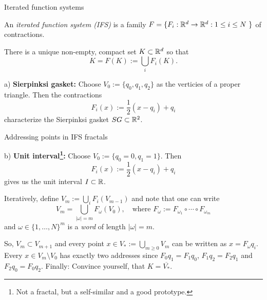 \begin{frame}{Iterated function systems}
    \begin{definition}
        An \textit{iterated function system (IFS)} is a family \(F = \{ F_i: \R^d \to \R^d : 1 \leq i \leq N \ \} \) of contractions.
    \end{definition}

    \begin{theorem}[Hutchinson]
        There is a unique non-empty, compact set \(K \subset \mathbb{R}^d \) so that
        \[ K = F(K) := \bigcup_i F_i(K). \]
    \end{theorem}

    \begin{example}
        a) \textbf{Sierpinksi gasket:} Choose \(V_0 := \{q_0, q_1, q_2 \} \) as the verticies of a proper triangle. Then the contractions
        \[ F_i(x) := \frac{1}{2}(x - q_i) + q_i \]
        characterize the Sierpinksi gasket \(SG \subset \mathbb{R}^2 \).
    \end{example}
\end{frame}

\begin{frame}{Addressing points in IFS fractals}
    \addtocounter{definition}{-1}
    \begin{example}[Cont.]
        b) \textbf{Unit interval\footnote{Not a fractal, but a self-similar and a good prototype.}:} Choose \(V_0 := \{q_0 = 0, q_1 = 1 \} \). Then
        \[ F_i(x) := \frac{1}{2}(x - q_i) + q_i \]
        gives us the unit interval \(I \subset \mathbb{R} \).
    \end{example}

    Iteratively, define \(V_m := \bigcup_i F_i(V_{m-1}) \) and note that one can write
    \[ V_m = \bigcup_{| \omega | = m} F_\omega(V_0), \quad \text{where } F_\omega := F_{\omega_1} \circ \cdots \circ F_{\omega_m} \]
    and \(\omega \in \{1, \dots, N \}^m \) is a \textit{word} of length \(| \omega | = m \).

    So, \(V_m \subset V_{m+1} \) and every point \(x \in V_* := \bigcup_{m \geq 0} V_m \) can be written as \(x = F_\omega q_i \).  Every \(x \in V_m \setminus V_0 \) has exactly two addresses since \(F_0 q_1 = F_1 q_0 \), \(F_1 q_2 = F_2 q_1 \) and \(F_2 q_0 = F_0 q_2 \).
    Finally: Convince yourself, that \(K = \overline{V_*} \).
\end{frame}

